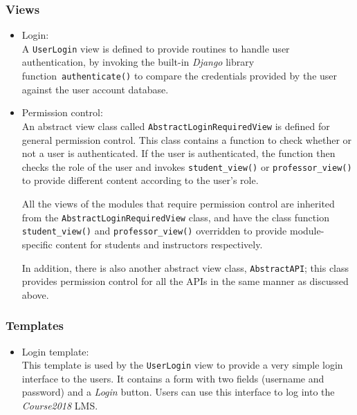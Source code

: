 \subsubsection{Views}

\begin{itemize}
    \item Login: \\
        A \texttt{UserLogin} view is defined to provide routines to handle user
        authentication, by invoking the built-in \emph{Django} library
        function~\texttt{authenticate()}
        to compare the credentials provided
        by the user against the user account database.

    \item Permission control: \\
        An abstract view class called \texttt{AbstractLoginRequiredView} is
        defined for general permission control. This class contains a function
        to check whether or not a user is authenticated. If the user is
        authenticated, the function then checks the role of the user and
        invokes \texttt{student\_view()} or \texttt{professor\_view()} to
        provide different content according to the user's role.

        All the views of the modules that require permission control are
        inherited from the \texttt{AbstractLoginRequiredView} class, and have
        the class function \texttt{student\_\-view()} and
        \texttt{professor\_view()} overridden to provide module-specific
        content for students and instructors respectively.

        In addition, there is also another abstract view class,
        \texttt{AbstractAPI}; this class provides permission
        control for all the APIs in the same manner as discussed above.
\end{itemize}

\subsubsection{Templates}

\begin{itemize}
    \item Login template: \\
        This template is used by the \texttt{UserLogin} view to provide a very
        simple login interface to the users. It contains a form with two
        fields (username and password) and a \emph{Login} button. Users can
        use this interface to log into the \emph{Course2018} LMS.
\end{itemize}


